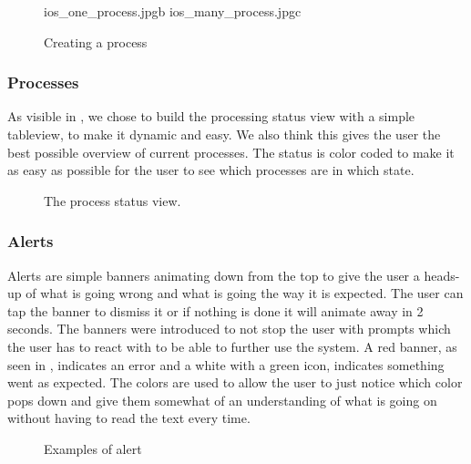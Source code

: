 \begin{figure}[ht]
	{ios_one_process.jpg}{b}
	{ios_many_process.jpg}{c}
\caption{Creating a process}
\label{fig:ios_creating_process}
\end{figure}
\FloatBarrier

\subsubsection{Processes}

As visible in , we chose to build the processing status view with a simple tableview, to make it dynamic and easy. We also think this gives the user the best possible overview of current processes. The status is color coded to make it as easy as possible for the user to see which processes are in which state.
\begin{figure}[h]
\caption{The process status view.}
\label{fig:ios_processingStatus}
\end{figure}
\FloatBarrier

\subsubsection{Alerts}
Alerts are simple banners animating down from the top to give the user a heads-up of what is going wrong and what is going the way it is expected. The user can tap the banner to dismiss it or if nothing is done it will animate away in 2 seconds. The banners were introduced to not stop the user with prompts which the user has to react with to be able to further use the system. A red banner, as seen in , indicates an error and a white with a green icon, indicates something went as expected. The colors are used to allow the user to just notice which color pops down and give them somewhat of an understanding of what is going on without having to read the text every time.
\begin{figure}[ht]
\caption{Examples of alert}
\label{fig:ios_alerts}
\end{figure}
\FloatBarrier


